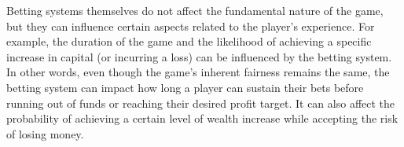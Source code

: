 \documentclass[11pt,twoside]{article}
\numberwithin{Theorem}{section}
\numberwithin{Definition}{section}
\numberwithin{Lemma}{section}
\numberwithin{Algorithm}{section}
\numberwithin{equation}{section}
\begin{document}
Betting systems themselves do not affect the fundamental nature of the game, but they can influence certain aspects related to the player's experience. For example, the duration of the game and the likelihood of achieving a specific increase in capital (or incurring a loss) can be influenced by the betting system. In other words, even though the game's inherent fairness remains the same, the betting system can impact how long a player can sustain their bets before running out of funds or reaching their desired profit target. It can also affect the probability of achieving a certain level of wealth increase while accepting the risk of losing money.
\clearpage



\clearpage




\appendix
\end{document}
